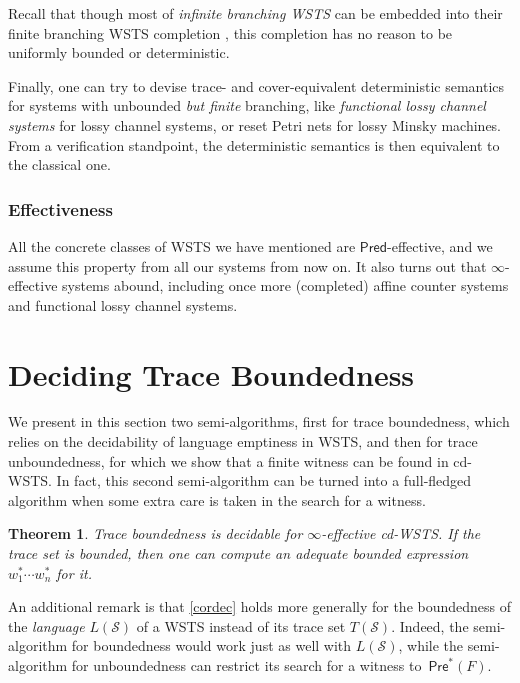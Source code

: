 \documentclass[11pt,reqno,a4paper]{amsart}
\renewcommand{\cite}{\citep}
\theoremstyle{plain}
\newtheorem{theorem}{Theorem}
\theoremstyle{definition}
\theoremstyle{remark}
\renewcommand{\paragraph}{\subsubsection*}
\begin{document}
Recall that though most of \emph{infinite branching WSTS} can be embedded into their finite branching WSTS completion \cite{BFGHM-lics15}, this completion has no reason to be uniformly bounded or deterministic.

Finally, one can try to devise trace- and cover-equivalent
deterministic semantics for systems with unbounded \emph{but finite} branching, like
\emph{functional lossy channel systems} \citep{cwsts1} for lossy
channel systems, or reset Petri nets for lossy Minsky machines.  From
a verification standpoint, the deterministic semantics is then
equivalent to the classical one. 


\paragraph{Effectiveness}
All the concrete classes of WSTS we have mentioned are
$\mathsf{Pred}$-effective, and we assume this property from all our
systems from now on.  It also turns out that $\infty$-effective
systems abound, including once more (completed) affine counter systems
\citep{cwsts2} and functional lossy channel systems.

\section{Deciding Trace Boundedness}\label{sec:dec}
We present in this section two semi-algorithms, first for trace
boundedness, which relies on the decidability of language emptiness in
WSTS, and then for trace unboundedness, for which we show that a
finite witness can be found in cd-WSTS.  In fact, this second
semi-algorithm can be turned into a full-fledged algorithm when some
extra care is taken in the search for a witness.
\begin{theorem}\label{cordec}
  Trace boundedness is decidable for
  $\infty$-effective cd-WSTS.  If the trace set is
  bounded, then one can compute an adequate bounded expression
  $w_1^\ast\cdots w_n^\ast$ for it.
\end{theorem}
An additional remark is that \autoref{cordec} holds more generally for
the boundedness of the \emph{language} $L(\mathcal S)$ of a WSTS
instead of its trace set $T(\mathcal S)$.  Indeed, the semi-algorithm
for boundedness would work just as well with $L(\mathcal S)$,
while the semi-algorithm for unboundedness can restrict its search for
a witness to~$\mathsf{Pre}^\ast(F)$.
 
\end{document}
